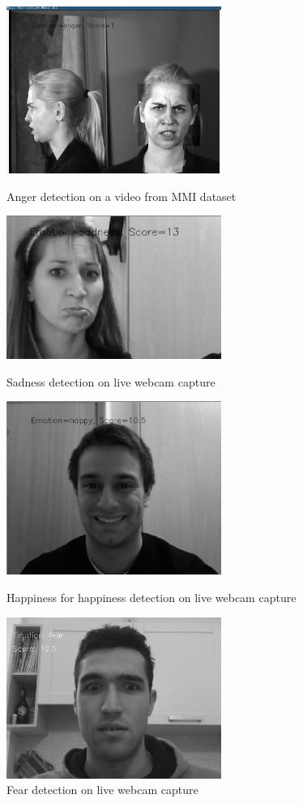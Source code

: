 \begin{figure}
\centering
\includegraphics[width=7cm]{images/example_anger.png}
\label{fig:example_anger}
\caption{Anger detection on a video from MMI dataset}
\end{figure}

\begin{figure}
\centering
\includegraphics[width=7cm]{images/example_sad.png}
\label{fig:example_sad}
\caption{Sadness detection on live webcam capture}
\end{figure}

\begin{figure}
\centering
\includegraphics[width=7cm]{images/exampl_happy2.png}
\label{fig:exampl_happy2}
\caption{Happiness for happiness detection on live webcam capture}
\end{figure}

\begin{figure}
  \centering
  \includegraphics[width=7cm]{./images/db_fear.png}
  \caption{Fear detection on live webcam capture}
  \label{fig:exampl_fear}
\end{figure}

